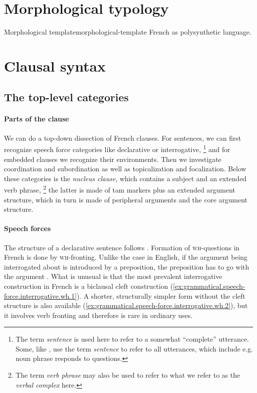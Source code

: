 \documentclass[a4paper, oneside, 12pt]{report}
\newcommand*{\citepage}[1]{p.~{#1}}
\newcommand*{\term}[1]{\emph{#1}}
\newcommand*{\category}[1]{\textsc{#1}}
\begin{document}
\section{Morphological typology}

\begin{todobox}{Morphological template}{morphological-template}
    French as polysynthetic language.
\end{todobox}

\section{Clausal syntax}

\subsection{The top-level categories}

\paragraph*{Parts of the clause}
We can do a top-down dissection of French clauses.
For sentences, we can first recognize speech force categories like declarative or interrogative,%
\footnote{
    The term \term{sentence} is used here to refer to a somewhat ``complete'' utterance.
    Some, like \citet{cgel}, use the term \term{sentence} to refer to all utterances,
    which include e.g. noun phrase responds to questions.
}
and for embedded clauses we recognize their environments.
Then we investigate coordination and subordination
as well as topicalization and focalization.
Below these categories is the \term{nucleus clause},
which contains a subject and an extended verb phrase,%
\footnote{
    The term \term{verb phrase} may also be used to refer to what we refer to as the \term{verbal complex} here.
}
the latter is made of \ac{tam} markers plus an extended argument structure,
which in turn is made of peripheral arguments and the core argument structure.

\paragraph*{Speech forces}
The structure of a declarative sentence follows .
Formation of \category{wh}-questions in French is done by \category{wh}-fronting.
Unlike the case in English, if the argument being interrogated about is introduced by a preposition,
the preposition has to go with the argument \citep[\citepage{60}]{rowlett2007syntax}.
What is unusual is that the most prevalent interrogative construction in French is a biclausal cleft construction
(\ref{ex:grammatical.speech-force.interrogative.wh.1}).
A shorter, structurally simpler form without the cleft structure is also available (\ref{ex:grammatical.speech-force.interrogative.wh.2}),
but it involves verb fronting and therefore is rare in ordinary uses.
\end{document}
